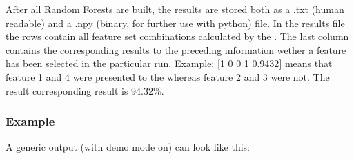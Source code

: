 \documentclass[letterpaper,10pt,english]{sphinxmanual}
\begin{document}
After all Random Forests are built, the results are stored both as a .txt (human readable) and a .npy (binary, for further use with python) file.
In the results file the rows contain all feature set combinations calculated by the {\hyperref[\detokenize{Overview:mla}]{}}.
The last column contains the corresponding results to the preceding information wether a feature has been selected in the particular run.
Example: {[}1 0 0 1 0.9432{]} means that feature 1 and 4 were presented to the {\hyperref[\detokenize{Overview:mla}]{}} whereas feature 2 and 3 were not. The result corresponding result is 94.32\%.


\subsubsection{Example}
\label{\detokenize{execution:example}}
A generic output (with demo mode on) can look like this:
\end{document}
